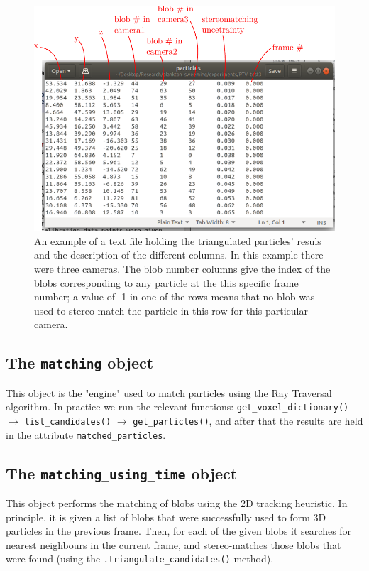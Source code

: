 \documentclass[10pt,a4paper]{article}
\begin{document}
\begin{figure}[!ht]
	\centering
	\includegraphics[width=12cm]{particle_file.pdf}
	\caption{An example of a text file holding the triangulated particles' resuls and the description of the different columns. In this example there were three cameras. The blob number columns give the index of the blobs corresponding to any particle at the this specific frame number; a value of -1 in one of the rows means that no blob was used to stereo-match the particle in this row for this particular camera. \label{fig:particlefile}} 
\end{figure}




\subsection{The \texttt{matching} object}

This object is the "engine" used to match particles using the Ray Traversal algorithm. In practice we run the relevant functions: \texttt{get\_voxel\_dictionary()} $\rightarrow$ \texttt{list\_candidates()} $\rightarrow$ \texttt{get\_particles()}, and after that the results are held in the attribute \texttt{matched\_particles}.




\subsection{The \texttt{matching\_using\_time} object}

This object performs the matching of blobs using the 2D tracking heuristic. In principle, it is given a list of blobs that were successfully used to form 3D particles in the previous frame. Then, for each of the given blobs it searches for nearest neighbours in the current frame, and stereo-matches those blobs that were found (using the \texttt{.triangulate\_candidates()} method). 
\end{document}
